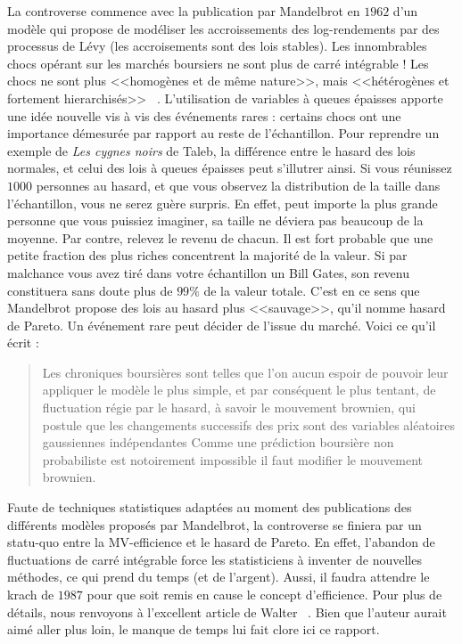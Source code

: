 \documentclass{article}
\begin{document}
La controverse commence avec la publication par Mandelbrot en $1962$ d'un modèle qui propose de modéliser les accroissements des log-rendements par des processus de Lévy (les accroisements sont des lois stables). Les innombrables chocs opérant sur les marchés boursiers ne sont plus de carré intégrable ! Les chocs ne sont plus <<homogènes et de même nature>>, mais <<hétérogènes et fortement hierarchisés>> ~\cite{Walter}. L'utilisation de variables à queues épaisses apporte une idée nouvelle vis à vis des événements rares : certains chocs ont une importance démesurée par rapport au reste de l'échantillon. Pour reprendre un exemple de \textit{Les cygnes noirs} de Taleb, la différence entre le hasard des lois normales, et celui des lois à queues épaisses peut s'illutrer ainsi. Si vous réunissez $1000$ personnes au hasard, et que vous observez la distribution de la taille dans l'échantillon, vous ne serez guère surpris. En effet, peut importe la plus grande personne que vous puissiez imaginer, sa taille ne déviera pas beaucoup de la moyenne. Par contre, relevez le revenu de chacun. Il est fort probable que une petite fraction des plus riches concentrent la majorité de la valeur. Si par malchance vous avez tiré dans votre échantillon un Bill Gates, son revenu constituera sans doute plus de $99\%$ de la valeur totale. C'est en ce sens que Mandelbrot propose des lois au hasard plus <<sauvage>>, qu'il nomme hasard de Pareto. Un événement rare peut décider de l'issue du marché. Voici ce qu'il écrit :

\begin{quotation}

Les chroniques boursières sont telles que l'on aucun espoir de pouvoir leur appliquer le modèle le plus simple, et par conséquent le plus tentant, de fluctuation régie par le hasard, à savoir le mouvement brownien, qui postule que les changements successifs des prix sont des variables aléatoires gaussiennes indépendantes
Comme une prédiction boursière non probabiliste est notoirement impossible il faut modifier le mouvement brownien.
\end{quotation}

Faute de techniques statistiques adaptées au moment des publications des différents modèles proposés par Mandelbrot, la controverse se finiera par un statu-quo entre la MV-efficience et le hasard de Pareto. En effet, l'abandon de fluctuations de carré intégrable force les statisticiens à inventer de nouvelles méthodes, ce qui prend du temps (et de l'argent). Aussi, il faudra attendre le krach de $1987$ pour que soit remis en cause le concept d'efficience. Pour plus de détails, nous renvoyons à l'excellent article de Walter ~\cite{Walter}. Bien que l'auteur aurait aimé aller plus loin, le manque de temps lui fait clore ici ce rapport.\\




\nocite{*}
\end{document}
